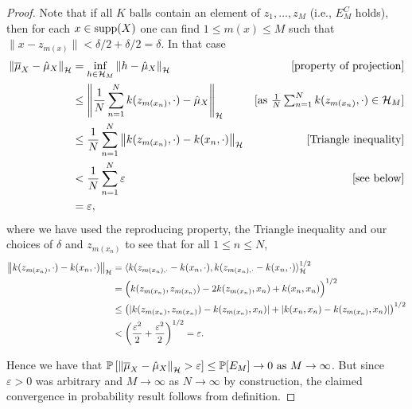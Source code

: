 \begin{lemma}
\begin{proof}
		Note that if all $K$ balls contain an element of $z_1, \ldots, z_M$ (i.e., $E_M^C$ holds), then for each $x \in \operatorname{supp}(X)$ one can find $1 \leq m(x) \leq M$ such that $\| x - z_{m(x)} \| < \delta/2 + \delta/2 = \delta$. In that case
		\begin{align}
		\left\| \overline{\mu}_X - \hat{\mu}_X \right\|_{\mathcal{H}}
		&=
		\inf_{h \in \mathcal{H}_M} \left\| h - \hat{\mu}_X \right\|_{\mathcal{H}}
		& \text{[property of projection]}\nonumber
		\\&\leq
		\left\| \frac{1}{N} \sum_{n = 1}^N k(z_{m(x_n)}, \cdot) - \hat{\mu}_X \right\|_{\mathcal{H}}
		& \text{[as $\textstyle\frac{1}{N} \textstyle\sum_{n = 1}^N k(z_{m(x_n)}, \cdot) \in \mathcal{H}_M$]}\nonumber
		\\&\leq
		\frac{1}{N} \sum_{n = 1}^N \left\| k(z_{m(x_n)}, \cdot) - k(x_n, \cdot) \right\|_{\mathcal{H}}
		& \text{[Triangle inequality]}\nonumber
		\\&<
		\frac{1}{N} \sum_{n = 1}^N \varepsilon
		& \text{[see below]}\nonumber
		\\&=
		\varepsilon
		,
		\end{align}
		where we have used the reproducing property, the Triangle inequality and our choices of $\delta$ and $z_{m(x_n)}$ to see that for all $1 \leq n \leq N$,
		\begin{align}
		\left\| k(z_{m(x_n)}, \cdot) - k(x_n, \cdot) \right\|_{\mathcal{H}}
		&=
		\langle k(z_{m(x_n), \cdot} - k(x_n, \cdot), k(z_{m(x_n), \cdot} - k(x_n, \cdot) \rangle_{\mathcal{H}}^{1/2}
		\\&=
		\Big( k(z_{m(x_n)}, z_{m(x_n)})
		- 2 k(z_{m(x_n)}, x_n)
		+ k(x_n, x_n) \Big)^{1/2}
		\\&\leq
		\big( | k(z_{m(x_n)}, z_{m(x_n)}) - k(z_{m(x_n)}, x_n) |
		+ | k(x_n, x_n) - k(z_{m(x_n)}, x_n) | \big)^{1/2}
		\\&<
		\left( \frac{\varepsilon^2}{2} + \frac{\varepsilon^2}{2} \right)^{1/2}
		= \varepsilon
		.
		\end{align}

		Hence we have that $\mathbb{P}\left[
		\left\| \overline{\mu}_X - \hat{\mu}_X \right\|_{\mathcal{H}}
		> \varepsilon
		\right]
		\leq \mathbb{P}[ E_M ]
		\to 0
		\text{ as }
		M \to \infty$. But since $\varepsilon > 0$ was arbitrary and $M \to \infty$ as $N \to \infty$ by construction, the claimed convergence in probability result follows from definition.
	\end{proof}
\end{lemma}


